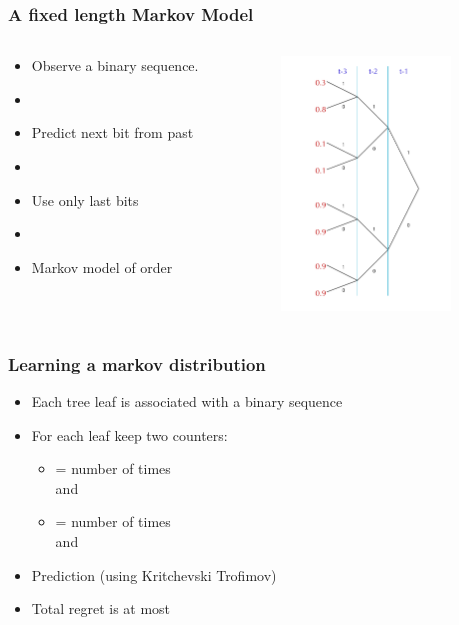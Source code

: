 \documentclass{beamer}
\begin{document}
\begin{frame}
\frametitle{A fixed length Markov Model}
\begin{columns}
\begin{column}[t]{8cm}
\begin{itemize}
\item Observe a binary sequence.
\item {}
\item Predict next bit from past
\item {}
\item Use only last  bits
\item {}
\item Markov model of order 
\end{itemize}
\end{column}
\begin{column}[T]{5cm}
\includegraphics[width=4.5cm]{figures/PredictionTree.pdf}
\end{column}
\end{columns}
\end{frame}

\begin{frame}
\frametitle{Learning a markov distribution}
\begin{itemize}
\item Each tree leaf is associated with a binary sequence
\item For each leaf keep two counters:
\begin{itemize}
\item {} = number of times  \\ and 
\item {} = number of times  \\ and 
\end{itemize}
\item Prediction (using Kritchevski Trofimov)
\R{\[p(x_t=1 | x_{t-1}=y_1,\ldots,x_{t-k}=y_k) 
= \frac{b_{y_1,\ldots,y_k}+1/2}{a_{y_1,\ldots,y_k}+b_{y_1,\ldots,y_k}+1}\]}
\item Total regret is at most 
\end{itemize}
\end{frame}
\end{document}
